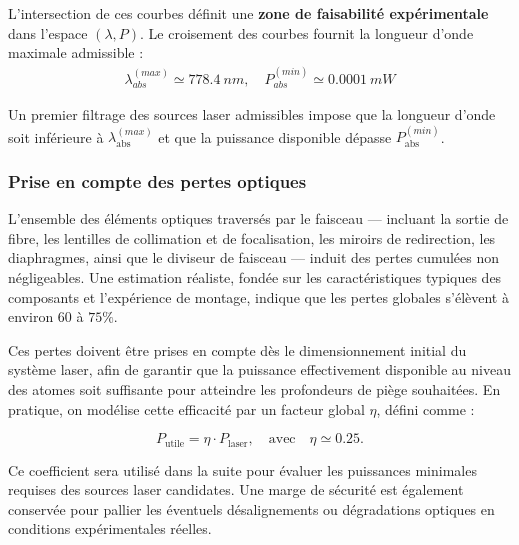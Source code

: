 L’intersection de ces courbes définit une {\bf zone de faisabilité expérimentale} dans l’espace $(\lambda, P)$. Le croisement des courbes fournit la longueur d’onde maximale admissible :
\begin{eqnarray*}
	\lambda^{(max)}_{abs} \simeq 778.4~nm , \quad P^{(min)}_{abs} \simeq 0.0001 ~ mW
\end{eqnarray*}

Un premier filtrage des sources laser admissibles impose que la longueur d’onde soit inférieure à $\lambda^{(max)}_{\text{abs}}$ et que la puissance disponible dépasse $P^{(min)}_{\text{abs}}$.

%

\subsubsection*{Prise en compte des pertes optiques}

L’ensemble des éléments optiques traversés par le faisceau — incluant la sortie de fibre, les lentilles de collimation et de focalisation, les miroirs de redirection, les diaphragmes, ainsi que le diviseur de faisceau — induit des pertes cumulées non négligeables. Une estimation réaliste, fondée sur les caractéristiques typiques des composants et l'expérience de montage, indique que les pertes globales s’élèvent à environ $60$ à $75\%$.

Ces pertes doivent être prises en compte dès le dimensionnement initial du système laser, afin de garantir que la puissance effectivement disponible au niveau des atomes soit suffisante pour atteindre les profondeurs de piège souhaitées. En pratique, on modélise cette efficacité par un facteur global $\eta$, défini comme :

\[
P_{\text{utile}} = \eta \cdot P_{\text{laser}}, \quad \text{avec} \quad \eta \simeq 0.25.
\]

Ce coefficient sera utilisé dans la suite pour évaluer les puissances minimales requises des sources laser candidates. Une marge de sécurité est également conservée pour pallier les éventuels désalignements ou dégradations optiques en conditions expérimentales réelles.

